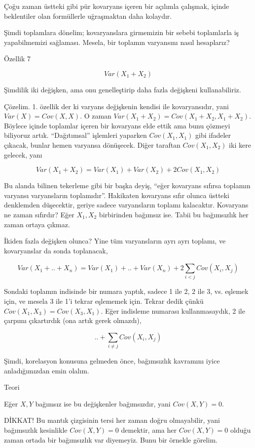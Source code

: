 \documentclass[12pt,fleqn]{article}\usepackage{../../common}
\begin{document}
Çoğu zaman üstteki gibi pür kovaryans içeren bir açılımla çalışmak, içinde
beklentiler olan formüllerle uğraşmaktan daha kolaydır. 

Şimdi toplamlara dönelim; kovaryanslara girmemizin bir sebebi toplamlarla
iş yapabilmemizi sağlaması. Mesela, bir toplamın varyansını nasıl
hesaplarız? 

Özellik 7

$$ Var(X_1+X_2) $$

Şimdilik iki değişken, ama onu genelleştirip daha fazla değişkeni
kullanabiliriz. 

Çözelim. 1. özellik der ki varyans değişkenin kendisi ile kovaryansıdır,
yani $Var(X) = Cov(X,X)$. O zaman $Var(X_1+X_2) = Cov(X_1+X_2,
X_1+X_2)$. Böylece içinde toplamlar içeren bir kovaryans elde ettik ama bunu çözmeyi 
biliyoruz artık. ``Dağıtımsal'' işlemleri yaparken $Cov(X_1,X_1)$ gibi
ifadeler çıkacak, bunlar hemen varyansa dönüşecek. Diğer taraftan
$Cov(X_1,X_2)$ iki kere gelecek, yanı

$$ Var(X_1+X_2) = Var(X_1) + Var(X_2)  + 2 Cov(X_1,X_2)$$

Bu alanda bilinen tekerleme gibi bir başka deyiş, ``eğer kovaryans sıfırsa
toplamın varyansı varyansların toplamıdır''. Hakikaten kovaryans sıfır
olunca üstteki denklemden düşecektir, geriye sadece varyansların toplamı
kalacaktır. Kovaryans ne zaman sıfırdır? Eğer $X_1,X_2$ birbirinden
bağımsız ise. Tabii bu bağımsızlık her zaman ortaya çıkmaz. 

İkiden fazla değişken olunca? Yine tüm varyansların ayrı ayrı toplamı, ve
kovaryanslar da sonda toplanacak,

$$ Var(X_1+ .. + X_n ) = Var(X_1) + .. + Var(X_n) + 2 \sum _{i<j}^{} Cov(X_i,X_j) $$

Sondaki toplamın indisinde bir numara yaptık, sadece 1 ile 2, 2 ile 3,
vs. eşlemek için, ve mesela 3 ile 1'i tekrar eşlememek için. Tekrar dedik
çünkü $Cov(X_1,X_3) = Cov(X_3,X_1)$. Eğer indisleme numarası
kullanmasaydık, 2 ile çarpımı çıkartırdık (ona artık gerek olmazdı),

$$ ..  + \sum _{i \ne j} Cov(X_i,X_j) $$

Şimdi, korelasyon konusuna gelmeden önce, bağımsızlık kavramını iyice
anladığımızdan emin olalım. 

Teori

Eğer $X,Y$ bağımsız ise bu değişkenler bağımsızdır, yani $Cov(X,Y)=0$.

DİKKAT! Bu mantık çizgisinin tersi her zaman doğru olmayabilir, yani
bağımsızlık kesinlikle $Cov(X,Y)=0$ demektir, ama her $Cov(X,Y)=0$ olduğu
zaman ortada bir bağımsızlık var diyemeyiz. Bunu bir örnekle görelim. 
\end{document}
